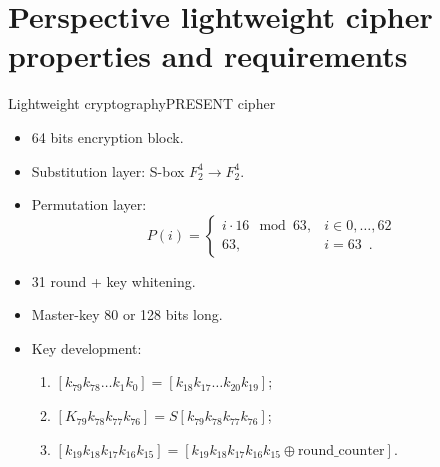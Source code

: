 \documentclass[10pt, ucs]{beamer}
\begin{document}
\section{Perspective lightweight cipher properties and requirements}
\begin{frame}{Lightweight cryptography}{PRESENT cipher}
    \begin{minipage}[t]{0.65\textwidth}
        \begin{itemize}
            \item 64 bits encryption block.
            \item Substitution layer: S-box $F_2^4 \rightarrow F_2^4$. \\
            \item Permutation layer: 
                \begin{equation}
                    \label{eqn:player}
                    \nonumber
                    P(i) = \left\{
                    \begin{array}{ll}
                        i \cdot 16 \mod 63, & i \in {0, \hdots, 62} \\
                        63,  & i = 63 \enspace .
                    \end{array} \right.
                \end{equation}
            \item 31 round + key whitening.
            \item Master-key 80 or 128 bits long.
            \item Key development:
                \begin{enumerate}
                    \setlength{\itemsep}{1pt}
                        \setlength{\parskip}{0pt}
                        \setlength{\parsep}{0pt}
                    \item $ [k_{79} k_{78} \hdots k_1 k_0] = [k_{18} k_{17} \hdots k_{20} k_{19}] $;
                    \item $ [K_{79} k_{78} k_{77} k_{76}] = S[k_{79} k_{78} k_{77} k_{76}] $;
                    \item $ [k_{19} k_{18} k_{17} k_{16} k_{15}] = [k_{19} k_{18} k_{17} k_{16} k_{15} 
                        \oplus \mbox{round\_counter}] $.
                \end{enumerate}
        \end{itemize}
    \end{minipage}%
    \begin{minipage}[t]{0.35\linewidth}
        \begin{figure}[h]

\end{figure}
\end{minipage}
\end{frame}
\end{document}
